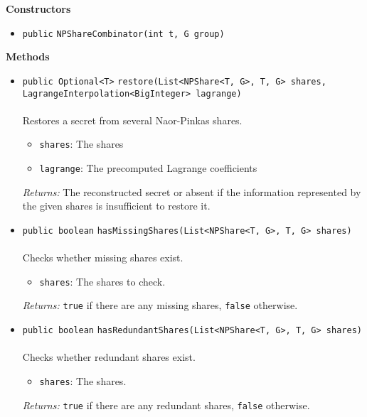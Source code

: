 \textbf{\sffamily Constructors}
\begin{itemize}
\item \lstinline|public| \lstinline|NPShareCombinator|\lstinline|(int t, G group)| \\[-0.6em]




\end{itemize}


\textbf{\sffamily Methods}
\begin{itemize}
\item \lstinline|public Optional<T>| \lstinline|restore|\lstinline|(List<NPShare<T, G>, T, G> shares, LagrangeInterpolation<BigInteger> lagrange)|\\ \\[-0.6em]
Restores a secret from several Naor-Pinkas shares.
\begin{itemize}
\item \lstinline|shares|: The shares
\item \lstinline|lagrange|: The precomputed Lagrange coefficients
\end{itemize}

\emph{Returns:} The reconstructed secret or absent if the information represented
 by the given shares is insufficient to restore it.

\item \lstinline|public boolean| \lstinline|hasMissingShares|\lstinline|(List<NPShare<T, G>, T, G> shares)|\\ \\[-0.6em]
Checks whether missing shares exist.
\begin{itemize}
\item \lstinline|shares|: The shares to check.
\end{itemize}

\emph{Returns:} \lstinline|true| if there are any missing shares, \lstinline|false| otherwise.

\item \lstinline|public boolean| \lstinline|hasRedundantShares|\lstinline|(List<NPShare<T, G>, T, G> shares)|\\ \\[-0.6em]
Checks whether redundant shares exist.
\begin{itemize}
\item \lstinline|shares|: The shares.
\end{itemize}

\emph{Returns:} \lstinline|true| if there are any redundant shares, \lstinline|false| otherwise.

\end{itemize}

